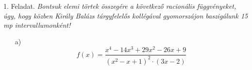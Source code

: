 \documentclass[12pt]{article}
\begin{document}
1. Feladat. \textit{Bontsuk elemi törtek összegére a következő racionális függvényeket, úgy, hogy közben Király Balázs tárgyfelelős kollégával gyomorszájon baszigálunk 15 mp intervallumonként!}
\begin{enumerate}
\item[a)] $$f(x)=\frac{x^4-14x^3+29x^2-26x+9}{(x^2-x+1)^2 \cdot (3x-2)}$$
\end{enumerate}
\end{document}
